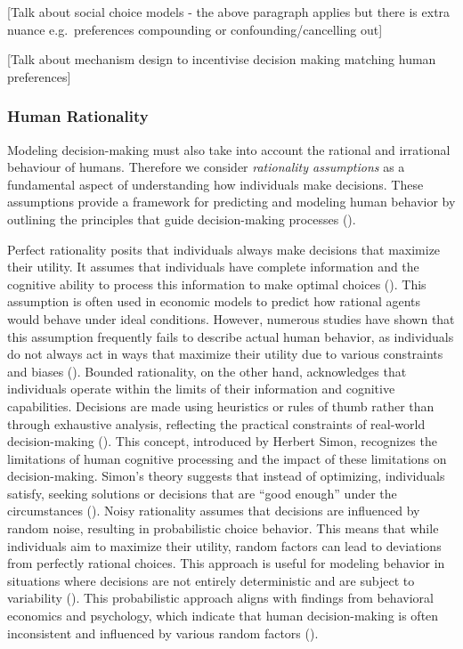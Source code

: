 \documentclass[
  letterpaper,
  DIV=11,
  numbers=noendperiod,
  oneside]{scrreprt}
\theoremstyle{remark}
\begin{document}
{[}Talk about social choice models - the above paragraph applies but
there is extra nuance e.g.~preferences compounding or
confounding/cancelling out{]}

{[}Talk about mechanism design to incentivise decision making matching
human preferences{]}

\subsubsection*{Human Rationality}\label{human-rationality}

Modeling decision-making must also take into account the rational and
irrational behaviour of humans. Therefore we consider \emph{rationality
assumptions} as a fundamental aspect of understanding how individuals
make decisions. These assumptions provide a framework for predicting and
modeling human behavior by outlining the principles that guide
decision-making processes ().

Perfect rationality posits that individuals always make decisions that
maximize their utility. It assumes that individuals have complete
information and the cognitive ability to process this information to
make optimal choices (). This assumption is often used in economic models to predict how
rational agents would behave under ideal conditions. However, numerous
studies have shown that this assumption frequently fails to describe
actual human behavior, as individuals do not always act in ways that
maximize their utility due to various constraints and biases
(). Bounded
rationality, on the other hand, acknowledges that individuals operate
within the limits of their information and cognitive capabilities.
Decisions are made using heuristics or rules of thumb rather than
through exhaustive analysis, reflecting the practical constraints of
real-world decision-making (). This concept, introduced by Herbert Simon, recognizes the
limitations of human cognitive processing and the impact of these
limitations on decision-making. Simon's theory suggests that instead of
optimizing, individuals satisfy, seeking solutions or decisions that are
``good enough'' under the circumstances
(). Noisy rationality
assumes that decisions are influenced by random noise, resulting in
probabilistic choice behavior. This means that while individuals aim to
maximize their utility, random factors can lead to deviations from
perfectly rational choices. This approach is useful for modeling
behavior in situations where decisions are not entirely deterministic
and are subject to variability
(). This
probabilistic approach aligns with findings from behavioral economics
and psychology, which indicate that human decision-making is often
inconsistent and influenced by various random factors
().
\end{document}
